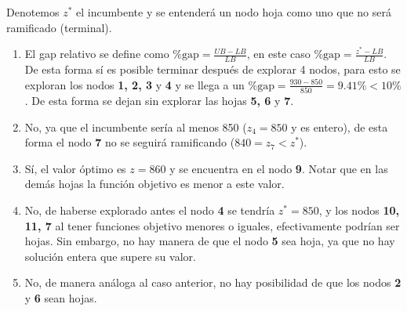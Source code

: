 Denotemos $z^*$ el incumbente y se entenderá un nodo hoja como uno que no será ramificado (terminal).

\begin{enumerate}
    \item El gap relativo se define como \(\%\text{gap} = \frac{UB - LB}{LB}\), en este caso \(\%\text{gap} = \frac{z^* - LB}{LB}\). De esta forma sí es posible terminar después de explorar 4 nodos, para esto se exploran los nodos \textbf{1, 2, 3} y \textbf{4} y se llega a un \(\%\text{gap} = \frac{930 - 850}{850} = 9.41\% < 10\%\). De esta forma se dejan sin explorar las hojas \textbf{5, 6} y \textbf{7}.
    
    \item No, ya que el incumbente sería al menos 850 (\(z_4 = 850\) y es entero), de esta forma el nodo \textbf{7} no se seguirá ramificando (\(840 = z_7 < z^*\)).
    
    \item Sí, el valor óptimo es \(z = 860\) y se encuentra en el nodo \textbf{9}. Notar que en las demás hojas la función objetivo es menor a este valor.
    
    \item No, de haberse explorado antes el nodo \textbf{4} se tendría \(z^* = 850\), y los nodos \textbf{10, 11, 7} al tener funciones objetivo menores o iguales, efectivamente podrían ser hojas. Sin embargo, no hay manera de que el nodo \textbf{5} sea hoja, ya que no hay solución entera que supere su valor.
    
    \item No, de manera análoga al caso anterior, no hay posibilidad de que los nodos \textbf{2} y \textbf{6} sean hojas.
\end{enumerate}
